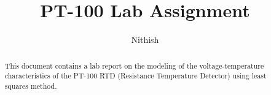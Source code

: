 \documentclass[journal,12pt,twocolumn]{IEEEtran}
\DeclareMathOperator*{\Res}{Res}
\begin{document}
\newtheorem{theorem}{Theorem}[section]
\newtheorem{problem}{Problem}
\newtheorem{proposition}{Proposition}[section]
\newtheorem{lemma}{Lemma}[section]
\newtheorem{corollary}[theorem]{Corollary}
\newtheorem{example}{Example}[section]
\newtheorem{definition}[problem]{Definition}
\newcommand{\BEQA}{\begin{eqnarray}}
\newcommand{\EEQA}{\end{eqnarray}}
\newcommand{\define}{\stackrel{\triangle}{=}}

\providecommand{\mbf}{\mathbf}
\providecommand{\pr}[1]{\ensuremath{\Pr\left(#1\right)}}
\providecommand{\qfunc}[1]{\ensuremath{Q\left(#1\right)}}
\providecommand{\sbrak}[1]{\ensuremath{{}\left[#1\right]}}
\providecommand{\lsbrak}[1]{\ensuremath{{}\left[#1\right.}}
\providecommand{\rsbrak}[1]{\ensuremath{{}\left.#1\right]}}
\providecommand{\brak}[1]{\ensuremath{\left(#1\right)}}
\providecommand{\lbrak}[1]{\ensuremath{\left(#1\right.}}
\providecommand{\rbrak}[1]{\ensuremath{\left.#1\right)}}
\providecommand{\cbrak}[1]{\ensuremath{\left\{#1\right\}}}
\providecommand{\lcbrak}[1]{\ensuremath{\left\{#1\right.}}
\providecommand{\rcbrak}[1]{\ensuremath{\left.#1\right\}}}
\theoremstyle{remark}
\newtheorem{rem}{Remark}
\newcommand{\sgn}{\mathop{\mathrm{sgn}}}
\providecommand{\abs}[1]{\left\vert#1\right\vert}
\providecommand{\res}[1]{\Res\displaylimits_{#1}} 
\providecommand{\norm}[1]{\left\lVert#1\right\rVert}
\providecommand{\mtx}[1]{\mathbf{#1}}
\providecommand{\mean}[1]{E\left[ #1 \right]}
\providecommand{\fourier}{\overset{\mathcal{F}}{ \rightleftharpoons}}
\providecommand{\system}[1]{\overset{\mathcal{#1}}{ \longleftrightarrow}}
\newcommand{\solution}{\noindent \textbf{Solution: }}
\newcommand{\cosec}{\,\text{cosec}\,}
\providecommand{\dec}[2]{\ensuremath{\overset{#1}{\underset{#2}{\gtrless}}}}
\newcommand{\myvec}[1]{\ensuremath{\begin{pmatrix}#1\end{pmatrix}}}
\newcommand{\mydet}[1]{\ensuremath{\begin{vmatrix}#1\end{vmatrix}}}
\renewcommand{\vec}[1]{\boldsymbol{\mathbf{#1}}}
\def\putbox#1#2#3{\makebox[0in][l]{\makebox[#1][l]{}\raisebox{\baselineskip}[0in][0in]{\raisebox{#2}[0in][0in]{#3}}}}
     \def\rightbox#1{\makebox[0in][r]{#1}}
     \def\centbox#1{\makebox[0in]{#1}}
     \def\topbox#1{\raisebox{-\baselineskip}[0in][0in]{#1}}
     \def\midbox#1{\raisebox{-0.5\baselineskip}[0in][0in]{#1}}
\vspace{3cm}
\title{PT-100 Lab Assignment}
\author{Nithish}
\maketitle
\tableofcontents
\bigskip
\begin{abstract}
    This document contains a lab report on the modeling of the voltage-temperature
    characteristics of the PT-100 RTD (Resistance Temperature Detector) using
    least squares method.
\end{abstract}
\end{document}
